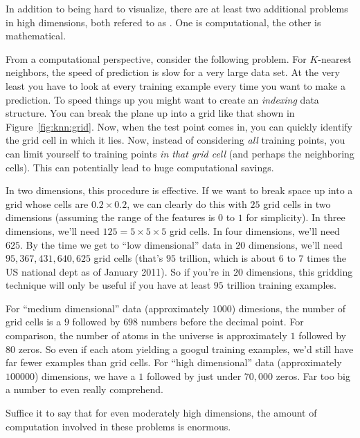 In addition to being hard to visualize, there are at least two
additional problems in high dimensions, both refered to as
.  One is computational, the
other is mathematical.


From a computational perspective, consider the following problem.
For $K$-nearest neighbors, the speed of prediction is slow for a very
large data set.  At the very least you have to look at every training
example every time you want to make a prediction.  To speed things up
you might want to create an \emph{indexing} data structure.  You can
break the plane up into a grid like that shown in
Figure~\ref{fig:knn:grid}.  Now, when the test point comes in, you can
quickly identify the grid cell in which it lies.  Now, instead of
considering \emph{all} training points, you can limit yourself to
training points \emph{in that grid cell} (and perhaps the neighboring
cells).  This can potentially lead to huge computational savings.

In two dimensions, this procedure is effective.  If we want to break
space up into a grid whose cells are $0.2 \times 0.2$, we can clearly
do this with $25$ grid cells in two dimensions (assuming the range of
the features is $0$ to $1$ for simplicity).  In three dimensions,
we'll need $125 = 5 \times 5 \times 5$ grid cells.  In four
dimensions, we'll need $625$.  By the time we get to ``low
dimensional'' data in $20$ dimensions, we'll need $95,367,431,640,625$
grid cells (that's $95$ trillion, which is about $6$ to $7$ times the
US national dept as of January 2011).  So if you're in $20$
dimensions, this gridding technique will only be useful if you have at
least $95$ trillion training examples.

For ``medium dimensional'' data (approximately $1000$) dimesions, the
number of grid cells is a $9$ followed by $698$ numbers before the
decimal point.  For comparison, the number of atoms in the universe is
approximately $1$ followed by $80$ zeros.  So even if each atom
yielding a googul training examples, we'd still have far fewer
examples than grid cells.  For ``high dimensional'' data
(approximately $100000$) dimensions, we have a $1$ followed by just
under $70,000$ zeros.  Far too big a number to even really comprehend.

Suffice it to say that for even moderately high dimensions, the amount
of computation involved in these problems is enormous.

